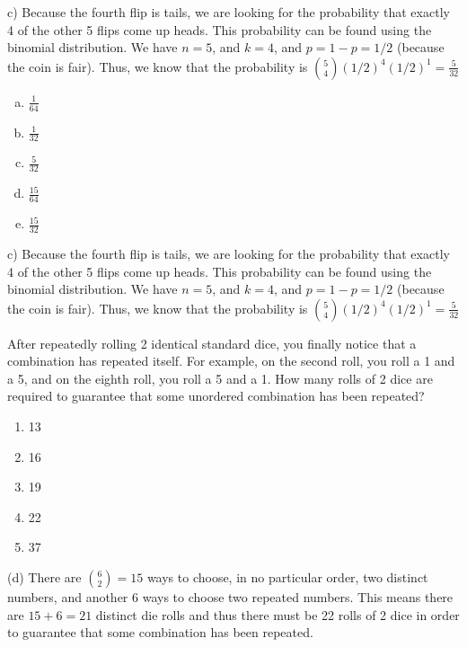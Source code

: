 \begin{solution}
\begin{enumerate} [(a)]
\end{enumerate}
\begin{solution}
c) Because the fourth flip is tails, we are looking for the probability that exactly 4 of the other 5 flips come up heads. This probability can be found using the binomial distribution. We have $n = 5$, and $k = 4$, and $p = 1 - p = 1/2$ (because the coin is fair). Thus, we know that the probability is $\binom{5}{4}(1/2)^4(1/2)^1 = \frac{5}{32}$
\end{solution}

\newpage
\begin{enumerate}[(a)]
	\item  $\frac{1}{64}$
    
	\item  $\frac{1}{32}$
    
	\item  $\frac{5}{32}$
    
	\item  $\frac{15}{64}$
    
	\item  $\frac{15}{32}$


\end{enumerate}
\begin{solution}

c) Because the fourth flip is tails, we are looking for the probability that exactly 4 of the other 5 flips come up heads. This probability can be found using the binomial distribution. We have $n = 5$, and $k = 4$, and $p = 1 - p = 1/2$ (because the coin is fair). Thus, we know that the probability is $\binom{5}{4}(1/2)^4(1/2)^1 = \frac{5}{32}$

\end{solution}


After repeatedly rolling 2 identical standard dice, you finally notice that a combination has repeated itself. For example, on the second roll, you roll a 1 and a 5, and on the eighth roll, you roll a 5 and a 1.  How many rolls of 2 dice are required to guarantee that some unordered combination has been repeated?  
\begin{enumerate}[{(a)}]
    \item 13
    \item 16
    \item 19
    \item 22
    \item 37
\end{enumerate}
\begin{solution}
(d) There are $\binom{6}{2} = 15$ ways to choose, in no particular order, two distinct numbers, and another 6 ways to choose two repeated numbers. This means there are $15 + 6 = 21$ distinct die rolls and thus there must be 22 rolls of 2 dice in order to guarantee that some combination has been repeated.
\end{solution}


\end{solution}
